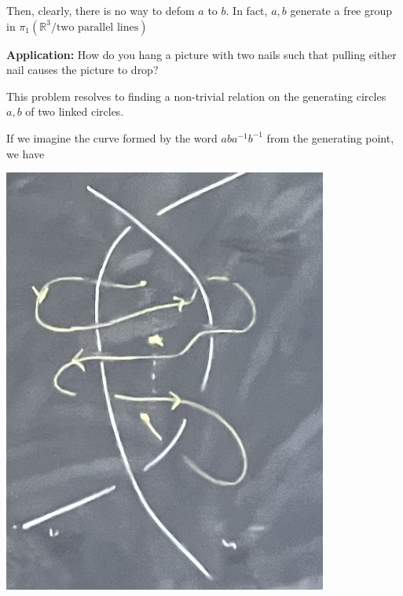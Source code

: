 \documentclass[12pt]{article}
\newcommand{\R}{\mathbb{R}}
\begin{document}
    Then, clearly, there is no way to defom $a$ to $b$. In fact, $a, b$ generate a free group in $\pi_1(\R^3/\text{two parallel lines})$ 

    \textbf{Application:} How do you hang a picture with two nails such that pulling either nail causes the picture to drop? 

    This problem resolves to finding a non-trivial relation on the generating circles $a, b$ of two linked circles.

    If we imagine the curve formed by the word $aba^{-1}b^{-1}$ from the generating point, we have 
    \begin{center}
        \includegraphics[width=0.8\textwidth]{Images/April 24 - Word 1.png}
    \end{center}
\end{document}
